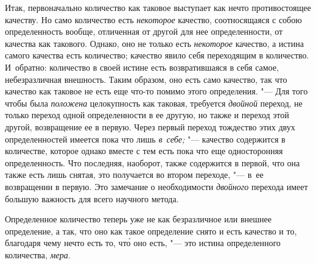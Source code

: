 Итак, первоначально количество как таковое выступает как нечто противостоящее
качеству. Но само количество есть {\em некоторое} качество, соотносящаяся
с собою определенность вообще, отличенная от другой для нее определенности,
от качества как такового. Однако, оно не только есть {\em некоторое} качество,
а истина самого качества есть количество; качество явило себя переходящим
в количество. И~обратно: количество в своей истине есть возвратившаяся в себя
самое, небезразличная внешность. Таким образом, оно есть само качество, так что
качество как таковое не есть еще что-то помимо этого определения. "--- Для того
чтобы была {\em положена} целокупность как таковая, требуется {\em двойной}
переход, не только переход одной определенности в ее другую, но также и переход
этой другой, возвращение ее в первую. Через первый переход тождество этих двух
определенностей имеется пока что лишь {\em в~себе;} "--- качество содержится
в количестве, которое однако вместе с тем есть пока что еще односторонняя
определенность. Что последняя, наоборот, также содержится в первой, что она
также есть лишь снятая, это получается во втором переходе, "--- в~ее
возвращении в первую. Это замечание о необходимости {\em двойного} перехода
имеет большую важность для всего научного метода.

Определенное количество теперь уже не как безразличное или внешнее определение,
а так, что оно как такое определение снято и есть качество и то, благодаря чему
нечто есть то, чт\'{о} оно есть, "--- это истина определенного количества,
{\em мера}.

\subsubsection[Примечание]{}

